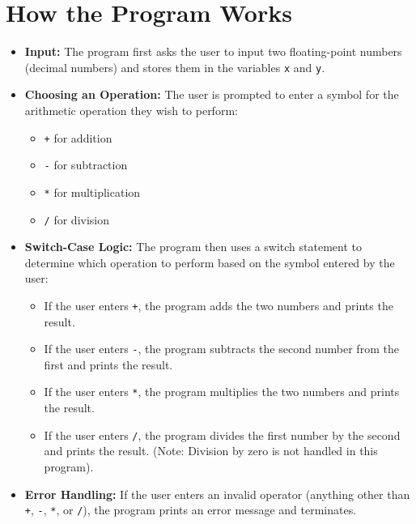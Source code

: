 \documentclass[a4paper,14pt]{article}
\begin{document}
\section*{How the Program Works}
\begin{itemize}
    \item \textbf{Input:} The program first asks the user to input two floating-point numbers (decimal numbers) and stores them in the variables \texttt{x} and \texttt{y}.
    
    \item \textbf{Choosing an Operation:} The user is prompted to enter a symbol for the arithmetic operation they wish to perform:
    \begin{itemize}
        \item \texttt{+} for addition
        \item \texttt{-} for subtraction
        \item \texttt{*} for multiplication
        \item \texttt{/} for division
    \end{itemize}

    \item \textbf{Switch-Case Logic:} The program then uses a switch statement to determine which operation to perform based on the symbol entered by the user:
    \begin{itemize}
        \item If the user enters \texttt{+}, the program adds the two numbers and prints the result.
        \item If the user enters \texttt{-}, the program subtracts the second number from the first and prints the result.
        \item If the user enters \texttt{*}, the program multiplies the two numbers and prints the result.
        \item If the user enters \texttt{/}, the program divides the first number by the second and prints the result. (Note: Division by zero is not handled in this program).
    \end{itemize}
    
    \item \textbf{Error Handling:} If the user enters an invalid operator (anything other than \texttt{+}, \texttt{-}, \texttt{*}, or \texttt{/}), the program prints an error message and terminates.
\end{itemize}
\end{document}

